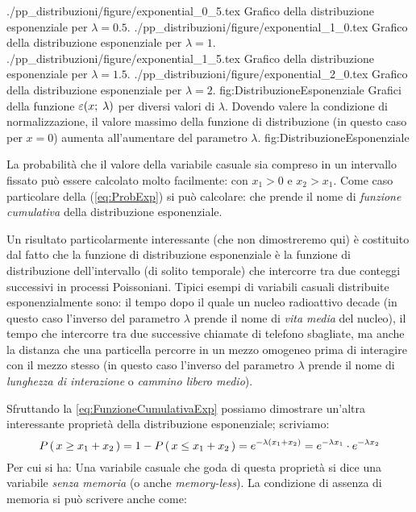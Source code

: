 \panelfig
{\twobytwotexfig
{./pp_distribuzioni/figure/exponential_0_5.tex}
{Grafico della distribuzione esponenziale per $\lambda=0.5$.}
{./pp_distribuzioni/figure/exponential_1_0.tex}
{Grafico della distribuzione esponenziale per $\lambda=1$.}
{./pp_distribuzioni/figure/exponential_1_5.tex}
{Grafico della distribuzione esponenziale per $\lambda=1.5$.}
{./pp_distribuzioni/figure/exponential_2_0.tex}
{Grafico della distribuzione esponenziale per $\lambda=2$.}
{fig:DistribuzioneEsponenziale}}
{Grafici della funzione $\varepsilon(x; \; \lambda)$ per diversi valori di
$\lambda$. Dovendo valere la condizione di normalizzazione, il valore massimo
della funzione di distribuzione (in questo caso per $x = 0$) aumenta
all'aumentare del parametro $\lambda$.}
{fig:DistribuzioneEsponenziale}

La probabilit\`a che il valore della variabile casuale sia compreso
in un intervallo fissato pu\`o essere calcolato molto facilmente:
con $x_1 > 0$ e $x_2 > x_1$.
Come caso particolare della (\ref{eq:ProbExp}) si pu\`o calcolare:
che prende il nome di {\itshape funzione cumulativa} della distribuzione
esponenziale.

Un risultato particolarmente interessante (che non dimostreremo qui)
\`e costituito dal fatto che la funzione di distribuzione esponenziale
\`e la funzione di distribuzione dell'intervallo (di solito temporale)
che intercorre tra due conteggi successivi in processi Poissoniani.
Tipici esempi di variabili casuali distribuite esponenzialmente sono:
il tempo dopo il quale un nucleo radioattivo decade (in questo caso
l'inverso del parametro $\lambda$ prende il nome di {\itshape vita media}
del nucleo), il tempo che intercorre tra due successive chiamate di telefono
sbagliate, ma anche la distanza che una particella percorre in un mezzo
omogeneo prima di interagire con il mezzo stesso (in questo caso l'inverso del
parametro $\lambda$ prende il nome di {\itshape lunghezza di interazione} o
{\itshape cammino libero medio}).

Sfruttando la \ref{eq:FunzioneCumulativaExp} possiamo dimostrare un'altra
interessante propriet\`a della distribuzione esponenziale; scriviamo:
$$
\displaystyle P\left(\, x \geq x_1 + x_2 \, \right) = 1 - \displaystyle P\left(\, x \leq x_1 + x_2 \, \right) =
e^{-\lambda(x_1 + x_2)} = e^{-\lambda x_1}\cdot e^{-\lambda x_2}
$$
Per cui si ha:
Una variabile casuale che goda di questa propriet\`a si dice
una variabile {\itshape senza memoria} (o anche {\itshape memory-less}).
La condizione di assenza di memoria si pu\`o scrivere anche come:

